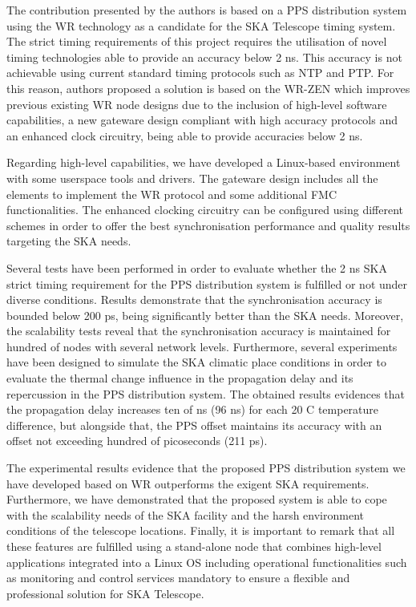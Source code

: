 The contribution presented by the authors is based on a PPS distribution system using the WR technology as a candidate for the SKA Telescope timing system. The strict timing requirements of this project requires the utilisation of novel timing technologies able to provide an accuracy below 2 ns. This accuracy is not achievable using current standard timing protocols such as NTP and PTP.
For this reason, authors proposed a solution is based on the WR-ZEN which improves previous existing WR node designs 
due to the inclusion of high-level software capabilities, a new gateware design compliant with high accuracy protocols and an enhanced clock circuitry, being able to provide accuracies below 2 ns.

Regarding high-level capabilities, we have developed a Linux-based environment with some userspace tools and drivers. The gateware design includes all the elements to implement the WR protocol and some additional FMC functionalities. The enhanced clocking circuitry can be configured using different schemes in order to offer the best synchronisation performance and quality results targeting the SKA needs. 

Several tests have been performed in order to evaluate whether the 2 ns SKA strict timing requirement for the PPS distribution system is fulfilled or not under diverse conditions.
Results demonstrate that the synchronisation accuracy is bounded below 200 ps, being significantly better than the SKA needs. Moreover, the scalability tests reveal that the synchronisation accuracy is maintained for hundred of nodes with several network levels. 
Furthermore, several experiments have been designed to simulate the SKA climatic place conditions 
in order to evaluate the thermal change influence in the propagation delay 
and its repercussion in the PPS distribution system. The obtained results evidences that the propagation delay increases ten of ns (96 ns) for each 20 C temperature difference, but alongside that, the PPS offset maintains its accuracy with an offset not exceeding hundred of picoseconds (211 ps). 

The experimental results evidence that the proposed PPS distribution system we have developed based on WR outperforms the exigent SKA requirements. Furthermore, we have demonstrated that the proposed system is able to cope with the scalability needs of the SKA facility and the harsh environment conditions of the telescope locations. 
Finally, it is important to remark that all these features are fulfilled using a stand-alone node that combines high-level applications integrated into a Linux OS including operational functionalities such as monitoring and control services mandatory to  ensure a flexible and professional solution for SKA Telescope.



